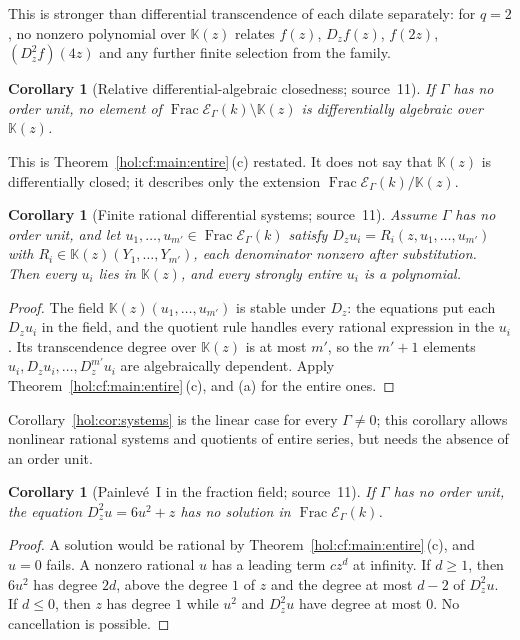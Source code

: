 \documentclass[11pt]{article}
\numberwithin{equation}{section}
\newtheorem{corollary}[theorem]{Corollary}
\theoremstyle{definition}
\theoremstyle{remark}
\newcommand{\KK}{\mathbb K}
\newcommand{\EK}{\mathcal E_\Gamma(k)}
\newcommand{\FE}{\operatorname{Frac}\EK}
\begin{document}
This is stronger than differential transcendence of each dilate separately:
for $q=2$, no nonzero polynomial over $\KK(z)$ relates $f(z)$, $D_zf(z)$,
$f(2z)$, $(D_z^2f)(4z)$ and any further finite selection from the family.

\begin{corollary}[Relative differential-algebraic closedness; source~11]
\label{hol:cf:cor:relative}
If $\Gamma$ has no order unit, no element of $\FE\setminus\KK(z)$ is
differentially algebraic over $\KK(z)$.
\end{corollary}

This is Theorem~\ref{hol:cf:main:entire}\,(c) restated. It does not say that
$\KK(z)$ is differentially closed; it describes only the extension
$\FE/\KK(z)$.

\begin{corollary}[Finite rational differential systems; source~11]
\label{hol:cf:cor:systems}
Assume $\Gamma$ has no order unit, and let $u_1,\ldots,u_{m'}\in\FE$ satisfy
$D_zu_i=R_i(z,u_1,\ldots,u_{m'})$ with $R_i\in\KK(z)(Y_1,\ldots,Y_{m'})$, each
denominator nonzero after substitution. Then every $u_i$ lies in $\KK(z)$, and
every strongly entire $u_i$ is a polynomial.
\end{corollary}

\begin{proof}
The field $\KK(z)(u_1,\ldots,u_{m'})$ is stable under $D_z$: the equations
put each $D_zu_i$ in the field, and the quotient rule handles every rational
expression in the $u_i$. Its transcendence degree over $\KK(z)$ is at most
$m'$, so the $m'+1$ elements $u_i,D_zu_i,\ldots,D_z^{m'}u_i$ are
algebraically dependent. Apply Theorem~\ref{hol:cf:main:entire}\,(c), and (a)
for the entire ones.
\end{proof}

Corollary~\ref{hol:cor:systems} is the linear case for every $\Gamma\ne0$;
this corollary allows nonlinear rational systems and quotients of entire
series, but needs the absence of an order unit.

\begin{corollary}[Painlev\'e~I in the fraction field; source~11]
\label{hol:cf:cor:painleve}
If $\Gamma$ has no order unit, the equation $D_z^2u=6u^2+z$ has no solution in
$\FE$.
\end{corollary}

\begin{proof}
A solution would be rational by Theorem~\ref{hol:cf:main:entire}\,(c), and
$u=0$ fails. A nonzero rational $u$ has a leading term $cz^d$ at infinity. If
$d\ge1$, then $6u^2$ has degree $2d$, above the degree $1$ of $z$ and the
degree at most $d-2$ of $D_z^2u$. If $d\le0$, then $z$ has degree $1$ while
$u^2$ and $D_z^2u$ have degree at most $0$. No cancellation is possible.
\end{proof}
\end{document}

